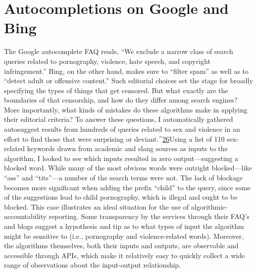 \section{Autocompletions on Google and Bing }
The Google autocomplete FAQ reads, ``We exclude a narrow class of search queries related to pornography, violence, hate speech, and copyright infringement.'' Bing, on the other hand, makes sure to ``filter spam'' as well as to ``detect adult or offensive content.'' Such editorial choices set the stage for broadly specifying the types of things that get censored. But what exactly are the boundaries of that censorship, and how do they differ among search engines? More importantly, what kinds of mistakes do these algorithms make in applying their editorial criteria? 
To answer these questions, I automatically gathered autosuggest results from hundreds of queries related to sex and violence in an effort to find those that were surprising or deviant.^{\href{#endnotes}{26}}Using a list of 110 sex-related keywords drawn from academic and slang sources as inputs to the algorithm, I looked to see which inputs resulted in zero output—suggesting a blocked word. While many of the most obvious words were outright blocked—like ``ass'' and ``tits''—a number of the search terms were not. The lack of blockage becomes more significant when adding the prefix ``child'' to the query, since some of the suggestions lead to child pornography, which is illegal and ought to be blocked. 
This case illustrates an ideal situation for the use of algorithmic-accountability reporting. Some transparency by the services through their FAQ's and blogs suggest a hypothesis and tip as to what types of input the algorithm might be sensitive to (i.e., pornography and violence-related words). Moreover, the algorithms themselves, both their inputs and outputs, are observable and accessible through APIs, which make it relatively easy to quickly collect a wide range of observations about the input-output relationship. 
